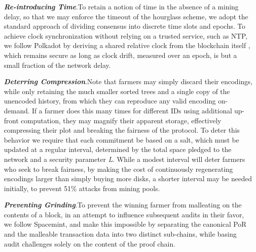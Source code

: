 \documentclass[conference]{IEEEtran}
\begin{document}
\vspace{2mm}

\noindent \textbf{\textit{Re-introducing Time}}.\quad To retain a notion of time in the absence of a mining delay, so that we may enforce the timeout of the hourglass scheme, we adopt the standard approach of dividing consensus into discrete time slots and epochs. To achieve clock synchronization without relying on a trusted service, such as NTP, we follow Polkadot by deriving a shared relative clock from the blockchain itself \cite{alper2019network}, which remains secure as long as clock drift, measured over an epoch, is but a small fraction of the network delay.

\vspace{2mm}

\noindent \textbf{\textit{Deterring Compression}}.\quad Note that farmers may simply discard their encodings, while only retaining the much smaller sorted trees and a single copy of the unencoded history, from which they can reproduce any valid encoding on-demand. If a farmer does this many times for different IDs using additional up-front  computation, they may magnify their apparent storage, effectively compressing their plot and breaking the fairness of the protocol. To deter this behavior we require that each commitment be based on a salt, which must be updated at a regular interval, determined by the total space pledged to the network and a security parameter \textit{L}. While a modest interval will deter farmers who seek to break fairness, by making the cost of continuously regenerating encodings larger than simply buying more disks, a shorter interval may be needed initially, to prevent 51\% attacks from mining pools.

\vspace{2mm}

\noindent \textbf{\textit{Preventing Grinding}}.\quad To prevent the winning farmer from malleating on the contents of a block, in an attempt to influence subsequent audits in their favor, we follow Spacemint, and make this impossible by separating the canonical PoR and the malleable transaction data into two distinct sub-chains, while basing audit challenges solely on the content of the proof chain.

\vspace{2mm}
\end{document}
